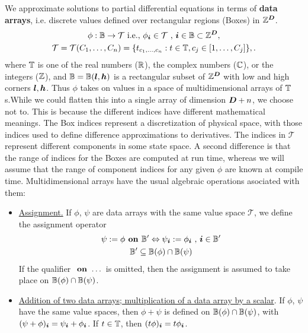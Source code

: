 \documentclass[12pt]{article}
\begin{document}
We approximate solutions to partial differential equations in terms of \textbf{data arrays}, i.e. discrete values defined over rectangular regions (Boxes) in $\mathbb{Z}^{\boldsymbol{D}}$.
\begin{gather}
\phi:\mathbb{B} \rightarrow \mathcal{T} \hbox{ i.e., } \phi_{\boldsymbol{i}} \in \mathcal{T} \hbox{ , } 
{\boldsymbol{i}} \in \mathbb{B} \subset \mathbb{Z}^{\boldsymbol{D}} , \label{eqn:rectArr}\\ 
\mathcal{T} = \mathcal{T}(C_1, \dots , C_n) = \{t_{c_1, \dots , c_n}: t \in \mathbb{T}, c_j \in [1, \dots , C_j]\}, \label{eqn:codomain}.
\end{gather}
where $\mathbb{T}$ is one of the real numbers ($\mathbb{R}$), the complex numbers ($\mathbb{C}$), or the integers ($\mathbb{Z}$), and $\mathbb{B} = \mathbb{B}({\boldsymbol{l}},{\boldsymbol{h}})$ is a rectangular subset of $\mathbb{Z}^{\boldsymbol{D}}$ with low and high corners ${\boldsymbol{l}},{\boldsymbol{h}}$. Thus $\phi$ takes on values in a space of multidimensional arrays of $\mathbb{T}$s.While we could flatten this into a single array of dimension ${\boldsymbol{D}} + n$, we choose not to. This is because the different indices have different mathematical meanings. The Box indices represent a discretization of physical space, with those indices used to define difference approximations to derivatives. The indices in $\mathcal{T}$ represent different components in some state space. A second difference is that the range of indices for the Boxes are computed at run time, whereas we will assume that the range of component indices for any given $\phi$ are known at compile time. Multidimensional arrays have the usual algebraic operations asociated with them:
\begin{itemize}
\item
\underline{Assignment.} If $\phi$, $\psi$ are data arrays with the same value space $\mathcal{T}$, we define the assignment operator 
\begin{gather*}
\psi := \phi \hbox{\bf{ on }} \mathbb{B}' \Leftrightarrow \psi_{\boldsymbol{i}} := \phi_{\boldsymbol{i}} \hbox{ , } {\boldsymbol{i}} \in \mathbb{B}'\\
 \mathbb{B}'\subseteq \mathbb{B}(\phi) \cap \mathbb{B}(\psi)
\end{gather*}
If the qualifier $\hbox{\bf{ on }} \dots$ is omitted, then the assignment is assumed to take place on  $\mathbb{B}(\phi) \cap \mathbb{B}(\psi)$.
\item
\underline{Addition of two data arrays; multiplication of a data array by a scalar}. If $\phi$, $\psi$ have the same value spaces, then $\phi + \psi$ is defined on $\mathbb{B}(\phi) \cap \mathbb{B}(\psi)$, with 
$(\psi + \phi)_{\boldsymbol{i}} = \psi_{\boldsymbol{i}} + \phi_{\boldsymbol{i}}$. If $t \in \mathbb{T}$, then 
$(t \phi )_{\boldsymbol{i}} = t \phi_{\boldsymbol{i}}$. 
\end{itemize}
\end{document}
